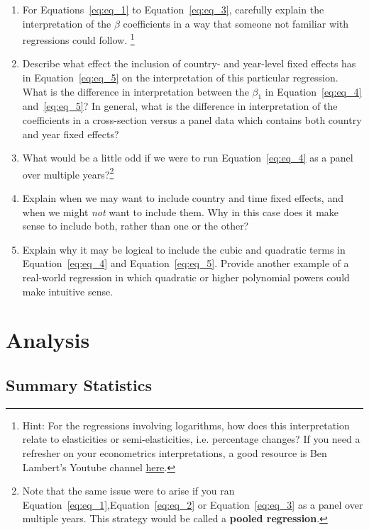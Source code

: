 \begin{enumerate}
\item For Equations~\ref{eq:eq_1} to Equation~\ref{eq:eq_3}, carefully explain the interpretation of the $\beta$ coefficients in a way that someone not familiar with regressions could follow. \footnote{Hint: For the regressions involving logarithms, how does this interpretation relate to elasticities or semi-elasticities, i.e. percentage changes? If you need a refresher on your econometrics interpretations, a good resource is Ben Lambert's Youtube channel \href{https://www.youtube.com/watch?v=JwGaos2Y9bM&list=PLwJRxp3blEvZyQBTTOMFRP_TDaSdly3gU&index=99}{here}.}
\item Describe what effect the inclusion of country- and year-level fixed effects has in Equation~\ref{eq:eq_5} on the interpretation of this particular regression. What is the difference in interpretation between the $\beta_1$ in Equation~\ref{eq:eq_4} and~\ref{eq:eq_5}? In general, what is the difference in interpretation of the coefficients in a cross-section versus a panel data which contains both country and year fixed effects? 
\item What would be a little odd if we were to run Equation~\ref{eq:eq_4} as a panel over multiple years?\footnote{Note that the same issue were to arise if you ran Equation~\ref{eq:eq_1},Equation~\ref{eq:eq_2} or Equation~\ref{eq:eq_3} as a panel over multiple years. This strategy would be called a \textbf{pooled regression}.}
\item Explain when we may want to include country and time fixed effects, and when we might \textit{not} want to include them. Why in this case does it make sense to include both, rather than one or the other?
\item Explain why it may be logical to include the cubic and quadratic terms in Equation~\ref{eq:eq_4} and Equation~\ref{eq:eq_5}. Provide another example of a real-world regression in which quadratic or higher polynomial powers could make intuitive sense.
\end{enumerate}







\section{Analysis}

\subsection{Summary Statistics}


